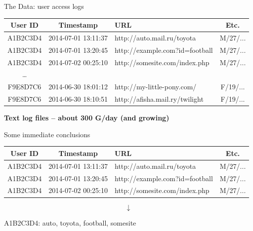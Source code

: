 \documentclass[aspectratio=1610]{beamer}
\begin{document}
\begin{frame}{The Data: user access logs}

\begin{center}
\begin{tabular}{c c l c}
\bf User ID & \bf Timestamp & \bf URL & \bf Etc. \\
\hline
A1B2C3D4 & 2014-07-01 13:11:37 & http://auto.mail.ru/toyota & M/27/... \\
A1B2C3D4 & 2014-07-01 13:20:45 & http://example.com?id=football & M/27/... \\
A1B2C3D4 & 2014-07-02 00:25:10 & http://somesite.com/index.php & M/27/... \\
\ldots & & & \\
F9E8D7C6 & 2014-06-30 18:01:12 & http://my-little-pony.com/ & F/19/... \\
F9E8D7C6 & 2014-06-30 18:10:51 & http://afisha.mail.ry/twilight & F/19/... \\
\end{tabular}

{\bf Text log files -- about 300 G/day (and growing)}
\end{center}

\end{frame}

\begin{frame}{Some immediate conclusions}

\begin{center}
\begin{tabular}{c c l c}
\bf User ID & \bf Timestamp & \bf URL & \bf Etc. \\
\hline
A1B2C3D4 & 2014-07-01 13:11:37 & http://{\color{mailorange}auto}.mail.ru/{\color{mailorange}toyota} & M/27/... \\
A1B2C3D4 & 2014-07-01 13:20:45 & http://example.com?id={\color{mailorange}football} & M/27/... \\
A1B2C3D4 & 2014-07-02 00:25:10 & http://{\color{mailorange}somesite}.com/index.php & M/27/... \\
\end{tabular}
\begin{huge}
\[
\downarrow
\]
\end{huge}
A1B2C3D4: \quad auto, toyota, football, somesite
\end{center}


\end{frame}
\end{document}
